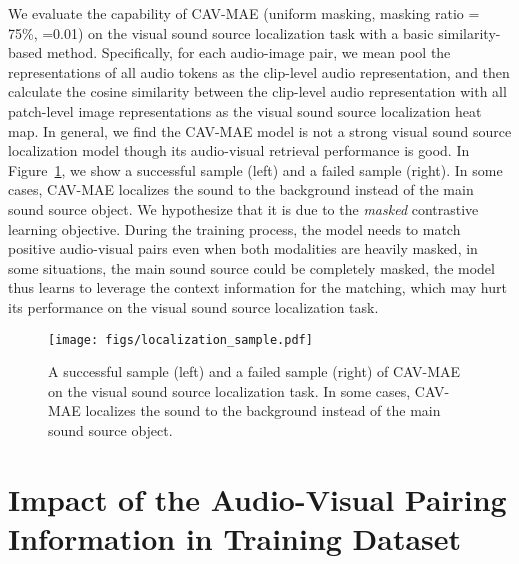 \documentclass{article} \usepackage{iclr2023_conference,times}
\begin{document}
We evaluate the capability of CAV-MAE (uniform masking, masking ratio = 75\%, =0.01) on the visual sound source localization task with a basic similarity-based method. Specifically, for each audio-image pair, we mean pool the representations of all audio tokens as the clip-level audio representation, and then calculate the cosine similarity between the clip-level audio representation with all patch-level image representations as the visual sound source localization heat map. In general, we find the CAV-MAE model is not a strong visual sound source localization model though its audio-visual retrieval performance is good. In Figure~\ref{fig:localization}, we show a successful sample (left) and a failed sample (right). In some cases, CAV-MAE localizes the sound to the background instead of the main sound source object. We hypothesize that it is due to the \emph{masked} contrastive learning objective. During the training process, the model needs to match positive audio-visual pairs even when both modalities are heavily masked, in some situations, the main sound source could be completely masked, the model thus learns to leverage the context information for the matching, which may hurt its performance on the visual sound source localization task. 

\begin{figure}[h]
\centering
\texttt{[image: figs/localization\_sample.pdf]}
\caption{A successful sample (left) and a failed sample (right) of CAV-MAE on the visual sound source localization task. In some cases, CAV-MAE localizes the sound to the background instead of the main sound source object.}
\label{fig:localization}
\end{figure}

\section{Impact of the Audio-Visual Pairing Information in Training Dataset}
\label{sec:shuffle}
\end{document}
